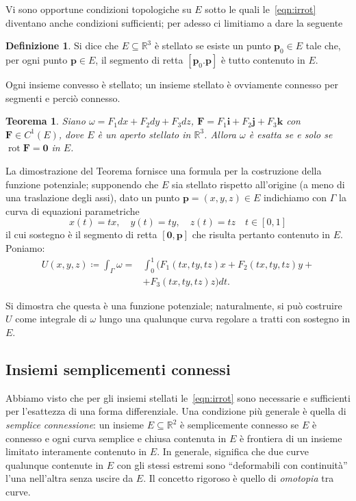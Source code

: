 \documentclass[a4paper]{book}
\DeclareMathOperator{\rot}{rot}
\numberwithin{equation}{section}
\theoremstyle{plain}
\newtheorem{teor}{Teorema}[section]
\theoremstyle{definition}
\newtheorem{defn}{Definizione}[section]
\theoremstyle{remark}
\renewcommand{\vec}{\boldsymbol}
\theoremstyle{example}
\begin{document}
Vi sono opportune condizioni topologiche su $E$ sotto le quali le~\eqref{eqn:irrot} diventano anche condizioni sufficienti; per adesso ci limitiamo a dare la seguente
	\begin{defn}
	Si dice che $E \subseteq \mathbb{R}^3$ è stellato se esiste un punto $\vec{p}_0 \in E$ tale che, per ogni punto $\vec{p} \in E$, il segmento di retta $[\vec{p}_0. \vec{p}]$ è tutto contenuto in $E$.
	\end{defn}

Ogni insieme convesso è stellato; un insieme stellato è ovviamente connesso per segmenti e perciò connesso.

\begin{teor}
Siano $\omega = F_1dx + F_2 dy + F_3 dz$, $\vec{F} = F_1\vec{i} + F_2\vec{j} + F_3\vec{k}$ con $\vec{F} \in C^1(E)$, dove $E$ è un aperto stellato in $\mathbb{R}^3$. Allora $\omega$ è esatta se e solo se $\rot{\vec{F}} = \vec{0}$ in $E$.
\end{teor}

La dimostrazione del Teorema fornisce una formula per la costruzione della funzione potenziale; supponendo che $E$ sia stellato rispetto all'origine (a meno di una traslazione degli assi), dato un punto $\vec{p} = (x, y, z) \in E$ indichiamo con $\Gamma$ la curva di equazioni parametriche
	\begin{equation*}
	x(t) = tx, \quad y(t) = ty, \quad z(t) = tz \quad t \in [0, 1]
	\end{equation*}
il cui sostegno è il segmento di retta $[\vec{0}, \vec{p}]$ che risulta pertanto contenuto in $E$. Poniamo:
	\begin{equation}
	\begin{split}
	U(x, y, z) \coloneqq \int_{\Gamma}\omega = &\int_0^1 (F_1(tx, ty, tz)x + F_2(tx, ty, tz)y + \\ &+ F_3(tx, ty, tz)z) dt.
	\end{split}
	\end{equation}

Si dimostra che questa è una funzione potenziale; naturalmente, si può costruire $U$ come integrale di $\omega$ lungo una qualunque curva regolare a tratti con sostegno in $E$.

\subsection{Insiemi semplicementi connessi}
Abbiamo visto che per gli insiemi stellati le~\eqref{eqn:irrot} sono necessarie e sufficienti per l'esattezza di una forma differenziale. Una condizione più generale è quella di \emph{semplice connessione}: un insieme $E \subseteq \mathbb{R}^2$ è semplicemente connesso se $E$ è connesso e ogni curva semplice e chiusa contenuta in $E$ è frontiera di un insieme limitato interamente contenuto in $E$. In generale, significa che due curve qualunque contenute in $E$ con gli stessi estremi sono ``deformabili con continuità''  l'una nell'altra senza uscire da $E$. Il concetto rigoroso è quello di \emph{omotopia} tra curve.
\end{document}
